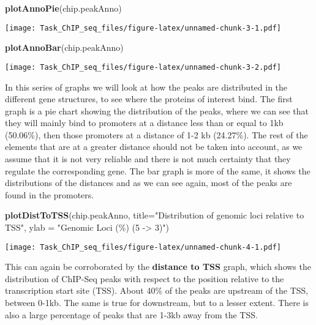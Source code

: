 \documentclass[
]{article}
\newenvironment{Shaded}{\begin{snugshade}}{\end{snugshade}}
\newcommand{\AttributeTok}[1]{\textcolor[rgb]{0.13,0.29,0.53}{#1}}
\newcommand{\FunctionTok}[1]{\textcolor[rgb]{0.13,0.29,0.53}{\textbf{#1}}}
\newcommand{\NormalTok}[1]{#1}
\newcommand{\StringTok}[1]{\textcolor[rgb]{0.31,0.60,0.02}{#1}}
\begin{document}
\begin{Shaded}
\begin{Highlighting}[]
\FunctionTok{plotAnnoPie}\NormalTok{(chip.peakAnno)}
\end{Highlighting}
\end{Shaded}

\texttt{[image: Task\_ChIP\_seq\_files/figure-latex/unnamed-chunk-3-1.pdf]}

\begin{Shaded}
\begin{Highlighting}[]
\FunctionTok{plotAnnoBar}\NormalTok{(chip.peakAnno)}
\end{Highlighting}
\end{Shaded}

\texttt{[image: Task\_ChIP\_seq\_files/figure-latex/unnamed-chunk-3-2.pdf]}

In this series of graphs we will look at how the peaks are distributed
in the different gene structures, to see where the proteins of interest
bind. The first graph is a pie chart showing the distribution of the
peaks, where we can see that they will mainly bind to promoters at a
distance less than or equal to 1kb (50.06\%), then those promoters at a
distance of 1-2 kb (24.27\%). The rest of the elements that are at a
greater distance should not be taken into account, as we assume that it
is not very reliable and there is not much certainty that they regulate
the corresponding gene. The bar graph is more of the same, it shows the
distributions of the distances and as we can see again, most of the
peaks are found in the promoters.

\begin{Shaded}
\begin{Highlighting}[]
\FunctionTok{plotDistToTSS}\NormalTok{(chip.peakAnno,}
              \AttributeTok{title=}\StringTok{"Distribution of genomic loci relative to TSS"}\NormalTok{,}
              \AttributeTok{ylab =} \StringTok{"Genomic Loci (\%) (5\textquotesingle{} {-}\textgreater{} 3\textquotesingle{})"}\NormalTok{)}
\end{Highlighting}
\end{Shaded}

\texttt{[image: Task\_ChIP\_seq\_files/figure-latex/unnamed-chunk-4-1.pdf]}

This can again be corroborated by the \textbf{distance to TSS} graph,
which shows the distribution of ChIP-Seq peaks with respect to the
position relative to the transcription start site (TSS). About 40\% of
the peaks are upstream of the TSS, between 0-1kb. The same is true for
downstream, but to a lesser extent. There is also a large percentage of
peaks that are 1-3kb away from the TSS.
\end{document}
